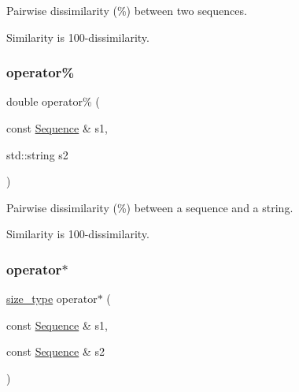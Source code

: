 Pairwise dissimilarity (\%) between two sequences. 

Similarity is 100-\/dissimilarity. \mbox{\label{classretrocombinator_1_1Sequence_a56fd21ad6db6a3cb7f7f4b9b5b6c84ea}} 
\subsubsection{\texorpdfstring{operator\%}{operator\%}\hspace{0.1cm}{\footnotesize\ttfamily [2/2]}}
{\footnotesize\ttfamily double operator\% (\begin{DoxyParamCaption}\item[{const \hyperlink{classretrocombinator_1_1Sequence}{Sequence} \&}]{s1,  }\item[{std\+::string}]{s2 }\end{DoxyParamCaption})\hspace{0.3cm}{\ttfamily [friend]}}



Pairwise dissimilarity (\%) between a sequence and a string. 

Similarity is 100-\/dissimilarity. \mbox{\label{classretrocombinator_1_1Sequence_a8cd9dc2cfea97399387e2876ee028c32}} 
\subsubsection{\texorpdfstring{operator$\ast$}{operator*}\hspace{0.1cm}{\footnotesize\ttfamily [1/2]}}
{\footnotesize\ttfamily \hyperlink{namespaceretrocombinator_a8e1541b50cee66a791df4c437ccbb385}{size\+\_\+type} operator$\ast$ (\begin{DoxyParamCaption}\item[{const \hyperlink{classretrocombinator_1_1Sequence}{Sequence} \&}]{s1,  }\item[{const \hyperlink{classretrocombinator_1_1Sequence}{Sequence} \&}]{s2 }\end{DoxyParamCaption})\hspace{0.3cm}{\ttfamily [friend]}}



